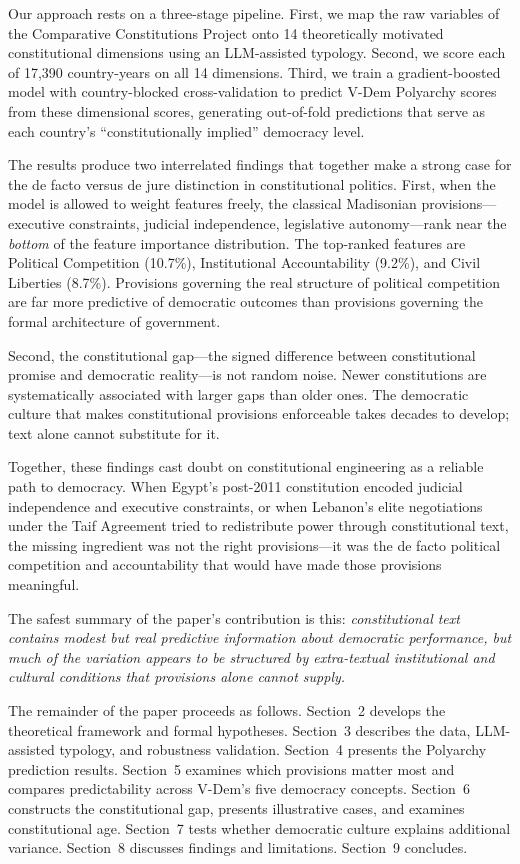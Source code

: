 \documentclass[9pt,twoside]{pnas-new}
\begin{document}
Our approach rests on a three-stage pipeline. First, we map the raw variables of the Comparative Constitutions Project onto 14 theoretically motivated constitutional dimensions using an LLM-assisted typology. Second, we score each of 17,390 country-years on all 14 dimensions. Third, we train a gradient-boosted model with country-blocked cross-validation to predict V-Dem Polyarchy scores from these dimensional scores, generating out-of-fold predictions that serve as each country's ``constitutionally implied'' democracy level.

The results produce two interrelated findings that together make a strong case for the de facto versus de jure distinction in constitutional politics. First, when the model is allowed to weight features freely, the classical Madisonian provisions---executive constraints, judicial independence, legislative autonomy---rank near the \emph{bottom} of the feature importance distribution. The top-ranked features are Political Competition (10.7\%), Institutional Accountability (9.2\%), and Civil Liberties (8.7\%). Provisions governing the real structure of political competition are far more predictive of democratic outcomes than provisions governing the formal architecture of government.

Second, the constitutional gap---the signed difference between constitutional promise and democratic reality---is not random noise. Newer constitutions are systematically associated with larger gaps than older ones. The democratic culture that makes constitutional provisions enforceable takes decades to develop; text alone cannot substitute for it.

Together, these findings cast doubt on constitutional engineering as a reliable path to democracy. When Egypt's post-2011 constitution encoded judicial independence and executive constraints, or when Lebanon's elite negotiations under the Taif Agreement tried to redistribute power through constitutional text, the missing ingredient was not the right provisions---it was the de facto political competition and accountability that would have made those provisions meaningful.

The safest summary of the paper's contribution is this: \textit{constitutional text contains modest but real predictive information about democratic performance, but much of the variation appears to be structured by extra-textual institutional and cultural conditions that provisions alone cannot supply.}

The remainder of the paper proceeds as follows. Section~2 develops the theoretical framework and formal hypotheses. Section~3 describes the data, LLM-assisted typology, and robustness validation. Section~4 presents the Polyarchy prediction results. Section~5 examines which provisions matter most and compares predictability across V-Dem's five democracy concepts. Section~6 constructs the constitutional gap, presents illustrative cases, and examines constitutional age. Section~7 tests whether democratic culture explains additional variance. Section~8 discusses findings and limitations. Section~9 concludes.
\end{document}
